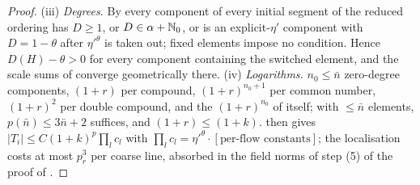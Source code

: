 \begin{proof}
(iii) \emph{Degrees.} By  every component of every initial segment of the reduced ordering has $D\ge1$, or $D\in\alpha+\mathbb N_0$, or is an explicit-$\eta'$ component with $D=1-\theta$ after $\eta'^\theta$ is taken out; fixed elements impose no condition. Hence $D(H)-\theta>0$ for every component containing the switched element, and the scale sums of  converge geometrically there.
(iv) \emph{Logarithms.} $n_0\le\bar n$ zero-degree components, $(1+r)$ per compound, $(1+r)^{n_0+1}$ per common number, $(1+r)^2$ per double compound, and the $(1+r)^{n_0}$ of  itself; with $\le\bar n$ elements, $p(\bar n)\le3\bar n+2$ suffices, and $(1+r)\le(1+k)$.
 then gives $|T_i|\le C(1+k)^p\prod_lc_l$ with $\prod_lc_l=\eta'^\theta\cdot[\text{per-flow constants}]$; the localisation \cite[(3.55)]{K1} costs at most $p_r^3$ per coarse line, absorbed in the field norms of step (5) of the proof of .
\end{proof}

